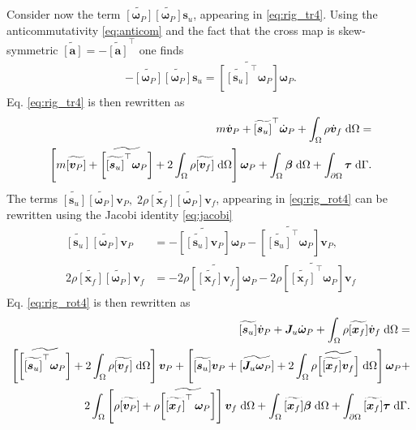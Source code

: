 \documentclass{svjour3}                     %
\newcommand{\crmat}[1]{\ensuremath{\widetilde{\left[#1\right]}}}
\begin{document}
	Consider now the term $\crmat{\bm{\omega}_P} \crmat{\bm{\omega}_P} \bm{s}_u$, appearing in \eqref{eq:rig_tr4}. Using the anticommutativity \eqref{eq:anticom} and the fact that the cross map is skew-symmetric $\crmat{\bm{a}} = -\crmat{\bm{a}}^\top$ one finds
	\begin{align*}
	-\crmat{\bm{\omega}_P} \crmat{\bm{\omega}_P} \bm{s}_u = \crmat{\crmat{\bm{s}_u}^\top\bm{\omega}_{P}} \bm{\omega}_{P}.
	\end{align*}
	Eq. \eqref{eq:rig_tr4} is then rewritten as
	\begin{equation}
	\label{eq:rig_tr5}
	\begin{split}
	m\dot{\bm{v}}_P + \crmat{\bm{s}_u}^\top \dot{\bm{\omega}}_P +   \int_{\Omega} \rho \dot{\bm{v}}_f \d{\Omega}  = \\
	\left[m \crmat{\bm{v}_P} + \crmat{\crmat{\bm{s}_u}^\top \bm\omega_P} +2 \int_{\Omega} \rho \crmat{\bm{v}_f} \d{\Omega} \right] \bm\omega_P +  \int_{\Omega} \bm\beta \d{\Omega} + \int_{\partial \Omega} \bm\tau \d{\Gamma}.
	\end{split}
	\end{equation}
	The terms $\crmat{\bm{s}_u} \crmat{\bm{\omega}_P} \bm{v}_P, \; 2\rho \crmat{\bm{x}_f} \crmat{\bm\omega_P} {\bm{v}}_f$, appearing in \eqref{eq:rig_rot4} can be rewritten using the Jacobi identity \eqref{eq:jacobi}
	\begin{align}
	\crmat{\bm{s}_u} \crmat{\bm{\omega}_P} \bm{v}_P &= - \crmat{\crmat{\bm{s}_u} \bm{v}_P} \bm{\omega}_P - \crmat{\crmat{\bm{s}_u}^\top \bm{\omega}_P} \bm{v}_P, \\
	2\rho \crmat{\bm{x}_f} \crmat{\bm\omega_P} {\bm{v}}_f &= - 2\rho \crmat{\crmat{\bm{x}_f} \bm{v}_f}\bm\omega_P - 2\rho \crmat{\crmat{\bm{x}_f}^\top \bm\omega_P} \bm{v}_f
	\end{align}
	Eq. \eqref{eq:rig_rot4} is then rewritten as
	\begin{equation}
	\label{eq:rig_rot5}
	\begin{split}
	\crmat{\bm{s}_u} \dot{\bm{v}}_P  + \bm{J}_u \dot{\bm\omega}_P + \int_{\Omega} \rho \crmat{\bm{x}_f} \dot{\bm{v}}_f \d{\Omega} = \\
	\left[\crmat{\crmat{\bm{s}_u}^\top \bm\omega_P} + 2 \int_{\Omega} \rho \crmat{\bm{v}_f} \d{\Omega} \right] \bm{v}_P + \left[\crmat{\bm{s}_u} \bm{v}_P + \crmat{\bm{J}_u \bm\omega_P} + 2 \int_{\Omega} \rho \crmat{\crmat{\bm{x}_f} {\bm{v}}_f} \d{\Omega} \right] \bm\omega_P + 
	\\
	2 \int_{\Omega} \left[\rho \crmat{\bm{v}_P} + \rho \crmat{\crmat{\bm{x}_f}^\top \, \bm\omega_P} \right] \bm{v}_f \d{\Omega} + \int_{\Omega}\crmat{\bm{x}_f} \bm\beta \d{\Omega} + \int_{\partial \Omega}\crmat{\bm{x}_f} \bm{\tau} \d{\Gamma}.
	\end{split}
	\end{equation}
\end{document}

